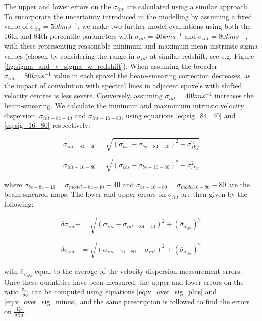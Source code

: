 \documentclass[fleqn,usenatbib]{mn2e}
\begin{document}
The upper and lower errors on the $\sigma_{int}$ are calculated using a similar approach.
To encorporate the uncertainty introduced in the modelling by assuming a fixed value of $\sigma_{int}=50 kms^{-1}$, we make two further model evaluations using both the 16th and 84th percentile parameters with $\sigma_{int} = 40 kms^{-1}$ and $\sigma_{int} = 80 kms^{-1}$, with these representing reasonable minimum and maximum mean instrinsic sigma values (chosen by considering the range in $\sigma_{int}$ at similar redshift, see e.g. Figure \ref{fig:sigma_and_v_sigma_w_redshift}).
When assuming the broader $\sigma_{int} = 80 kms^{-1}$ value in each spaxel the beam-smearing correction decreases, as the impact of convolution with spectral lines in adjacent spaxels with shifted velocity centres is less severe.
Conversely, assuming $\sigma_{int} = 40 kms^{-1}$ increases the beam-smearing.
We calculate the minimum and maxmimum intrinsic velocity dispersion, $\sigma_{int-84-40}$ and $\sigma_{int-16-80}$, using equations \ref{eq:sig_84_40} and \ref{eq:sig_16_80} respectively:

\begin{equation}\label{eq:sig_84_40}
   \sigma_{int-84-40} = \sqrt{(\sigma_{obs} - \sigma_{bs-84-40})^{2} - \sigma_{sky}^{2}}
\end{equation}

\begin{equation}\label{eq:sig_16_80}
   \sigma_{int-16-80} = \sqrt{\left(\sigma_{obs} - \sigma_{bs-16-80}\right)^{2} - \sigma_{sky}^{2}}
\end{equation}

where $\sigma_{bs-84-40} = \sigma_{model-84-40} - 40$ and $\sigma_{bs-16-80} = \sigma_{model16-80} - 80$ are the beam-smeared maps.
The lower and upper errors on $\sigma_{int}$ are then given by the following:

\begin{equation}\label{eq:sig_plus_error}
   \delta\sigma_{int}+ = \sqrt{\left(\sigma_{int} - \sigma_{int-84-40}\right)^{2} + \left(\bar{\sigma}_{\sigma_{obs}}\right)^{2}}
\end{equation}

\begin{equation}\label{eq:sig_minus_error}
   \delta\sigma_{int}- = \sqrt{\left(\sigma_{int-16-80} - \sigma_{int}\right)^{2} + \left(\bar{\sigma}_{\sigma_{obs}}\right)^{2}}
\end{equation}

with $\bar{\sigma}_{\sigma_{obs}}$ equal to the average of the velocity dispersion measurement errors.
Once these quantities have been measured, the upper and lower errors on the ratio $\frac{v_{2.2}}{\sigma{o}}$ can be computed using equations \ref{eq:v_over_sig_plus} and \ref{eq:v_over_sig_minus}, and the same prescription is followed to find the errors on $\frac{V_{C}}{\sigma{int}}$.
\end{document}
